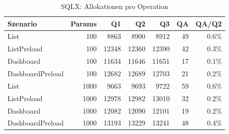 \begin{table}[ht]
\caption{SQLX: Allokationen pro Operation}
\begin{tabular}{lrrrrrr}
\toprule
Szenario & Params & Q1 & Q2 & Q3 & QA & QA/Q2 \\
\midrule
	List & 100 & 8863 & 8900 & 8912 & 49 & 0.6\% \\
	ListPreload & 100 & 12348 & 12360 & 12390 & 42 & 0.3\% \\
	Dashboard & 100 & 11634 & 11646 & 11651 & 17 & 0.1\% \\
	DashboardPreload & 100 & 12682 & 12689 & 12703 & 21 & 0.2\% \\
	List & 1000 & 9663 & 9693 & 9722 & 59 & 0.6\% \\
	ListPreload & 1000 & 12978 & 12982 & 13010 & 32 & 0.2\% \\
	Dashboard & 1000 & 12082 & 12090 & 12101 & 19 & 0.2\% \\
	DashboardPreload & 1000 & 13193 & 13229 & 13241 & 48 & 0.4\% \\
\bottomrule
\end{tabular}
\label{tab:benchmark_sqlx_allocsperop}
\end{table}
	